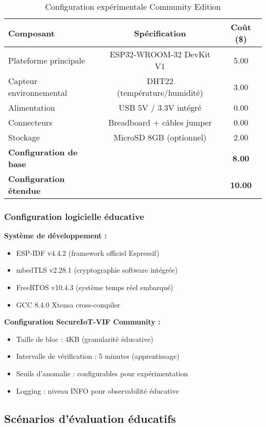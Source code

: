 \begin{table}[h]
\centering
\caption{Configuration expérimentale Community Edition}
\label{tab:experimental-setup-community}
\begin{tabular}{|l|c|c|}
\hline
\textbf{Composant} & \textbf{Spécification} & \textbf{Coût (\$)} \\
\hline
Plateforme principale & ESP32-WROOM-32 DevKit V1 & 5.00 \\
Capteur environnemental & DHT22 (température/humidité) & 3.00 \\
Alimentation & USB 5V / 3.3V intégré & 0.00 \\
Connecteurs & Breadboard + câbles jumper & 0.00 \\
Stockage & MicroSD 8GB (optionnel) & 2.00 \\
\hline
\textbf{Configuration de base} & & \textbf{8.00} \\
\textbf{Configuration étendue} & & \textbf{10.00} \\
\hline
\end{tabular}
\end{table}

\subsubsection{Configuration logicielle éducative}

\textbf{Système de développement :}
\begin{itemize}
    \item ESP-IDF v4.4.2 (framework officiel Espressif)
    \item mbedTLS v2.28.1 (cryptographie software intégrée)
    \item FreeRTOS v10.4.3 (système temps réel embarqué)
    \item GCC 8.4.0 Xtensa cross-compiler
\end{itemize}

\textbf{Configuration SecureIoT-VIF Community :}
\begin{itemize}
    \item Taille de bloc : 4KB (granularité éducative)
    \item Intervalle de vérification : 5 minutes (apprentissage)
    \item Seuils d'anomalie : configurables pour expérimentation
    \item Logging : niveau INFO pour observabilité éducative
\end{itemize}

\subsection{Scénarios d'évaluation éducatifs}

